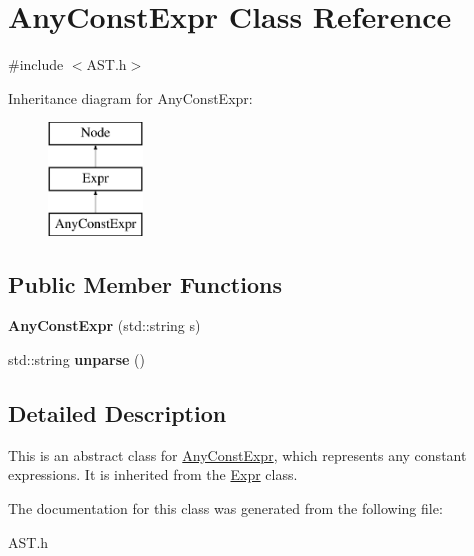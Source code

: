 \hypertarget{class_any_const_expr}{}\section{Any\+Const\+Expr Class Reference}
\label{class_any_const_expr}


{\ttfamily \#include $<$A\+S\+T.\+h$>$}

Inheritance diagram for Any\+Const\+Expr\+:\begin{figure}[H]
\begin{center}
\leavevmode
\includegraphics[height=3.000000cm]{class_any_const_expr}
\end{center}
\end{figure}
\subsection*{Public Member Functions}
\begin{DoxyCompactItemize}
\item 
\hypertarget{class_any_const_expr_ad236a00d76c9a422426bcf568e3fb25e}{}{\bfseries Any\+Const\+Expr} (std\+::string s)\label{class_any_const_expr_ad236a00d76c9a422426bcf568e3fb25e}

\item 
\hypertarget{class_any_const_expr_a2a6a93f71286fa021fa8570a3e9e9edf}{}std\+::string {\bfseries unparse} ()\label{class_any_const_expr_a2a6a93f71286fa021fa8570a3e9e9edf}

\end{DoxyCompactItemize}


\subsection{Detailed Description}
This is an abstract class for \hyperlink{class_any_const_expr}{Any\+Const\+Expr}, which represents any constant expressions. It is inherited from the \hyperlink{class_expr}{Expr} class. 

The documentation for this class was generated from the following file\+:\begin{DoxyCompactItemize}
\item 
A\+S\+T.\+h\end{DoxyCompactItemize}
